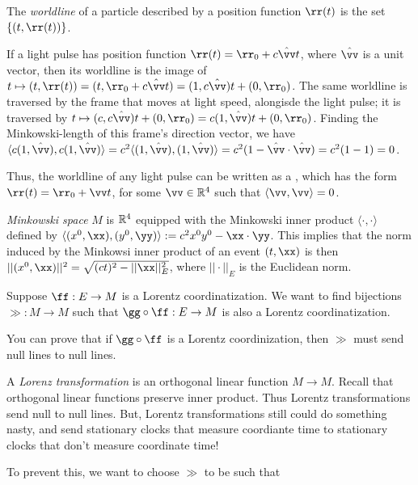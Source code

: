 \documentclass{article}
\begin{document}
\vspace{.5cm}

The \textit{worldline} of a particle described by a position function $\rr(t)$ is the set $\{(t, \rr(t))\}$.

If a light pulse has position function $\rr(t) = \rr_0 + c\hat{\vv} t$, where $\hat{\vv}$ is a unit vector, then its worldline is the image of $t \mapsto (t, \rr(t)) = (t, \rr_0 + c\hat{\vv} t) = (1, c\hat{\vv}) t + (0, \rr_0)$. The same worldline is traversed by the frame that moves at light speed, alongisde the light pulse; it is traversed by $t \mapsto (c, c \hat{\vv}) t + (0, \rr_0) = c(1, \hat{\vv})t + (0, \rr_0)$. Finding the Minkowski-length of this frame's direction vector, we have $\langle c(1, \hat{\vv}), c(1, \hat{\vv})\rangle = c^2\langle(1, \hat{\vv}), (1, \hat{\vv})\rangle = c^2(1 - \hat{\vv} \cdot \hat{\vv}) = c^2 (1 - 1) = 0$.

Thus, the worldline of any light pulse can be written as a  , which has the form $\rr(t) = \rr_0 + \vv t$, for some $\vv \in \R^4$ such that $\langle \vv, \vv \rangle = 0$.

\vspace{.5cm}

\textit{Minkowski space} $M$ is $\mathbb{R}^4$ equipped with the Minkowski inner product $\langle \cdot, \cdot \rangle$ defined by ${\langle (x^0, \xx), (y^0, \yy) \rangle := c^2 x^0 y^0 - \xx \cdot \yy}$. This implies that the norm induced by the Minkowsi inner product of an event $(t, \xx)$ is then ${||(x^0, \xx)||^2 = \sqrt{(ct)^2 - ||\xx||_E^2}}$, where $||\cdot||_E$ is the Euclidean norm.

Suppose $\ff:E \rightarrow M$ is a Lorentz coordinatization. We want to find bijections $\gg:M \rightarrow M$ such that $\gg \circ \ff:E \rightarrow M$ is also a Lorentz coordinatization.

You can prove that if $\gg \circ \ff$ is a Lorentz coordinization, then $\gg$ must send null lines to null lines.

\vspace{.5cm}

A \textit{Lorenz transformation} is an orthogonal linear function $M \rightarrow M$. Recall that orthogonal linear functions preserve inner product. Thus Lorentz transformations send null to null lines. But, Lorentz transformations still could do something nasty, and send stationary clocks that measure coordiante time to stationary clocks that don't measure coordinate time!

To prevent this, we want to choose $\gg$ to be such that
\end{document}
